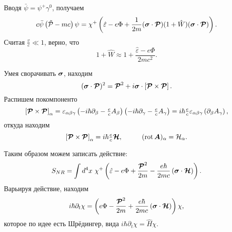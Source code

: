 Вводя $\bar{\psi} = \psi^+ \gamma^0$, получаем
\begin{equation*}
	c \bar{\psi} \left(\mathcal{\tilde{P}} - m c\right) \psi = 
	\chi^+ \left(
		\hat{\varepsilon} - e \Phi + \frac{1}{2m} (\mbox{\boldmath $\sigma$} \cdot \mbox{\boldmath $\mathcal P$}) 
 (1 + \hat{W}) (\mbox{\boldmath $\sigma$} \cdot \mbox{\boldmath $\mathcal P$})
 \right).
\end{equation*}
Считая $\frac{v}{c} \ll 1$, верно, что
\begin{equation*}
	1 + \hat{W} \approx	1 + \frac{\hat{\varepsilon}-e \Phi}{2 mc^2}.
\end{equation*}


Умея сворачивать $\mbox{\boldmath $\sigma$}$, находим
\begin{equation*}
	(\mbox{\boldmath $\sigma$} \cdot \mbox{\boldmath $\mathcal P$})^2 = \mbox{\boldmath $\mathcal P$}^2 + i \mbox{\boldmath $\sigma$} \cdot \left[\mbox{\boldmath $\mathcal P$} \times  \mbox{\boldmath $\mathcal P$}\right].
\end{equation*}
Распишем покомпоненто
\begin{equation*}
	\left[\mbox{\boldmath $\mathcal P$} \times  \mbox{\boldmath $\mathcal P$}\right]_\alpha = \varepsilon_{\alpha \beta \gamma} \left(
		- i \hbar \partial_\beta - \tfrac{e}{c} A_\beta
	\right)\left(
		- i \hbar \partial_\gamma - \tfrac{e}{c} A_\gamma
	\right) = i \hbar \tfrac{e}{c} \varepsilon_{\alpha \beta \gamma} \left(
		\partial_\beta A_\gamma
	\right),
\end{equation*}
откуда находим
\begin{equation*}
	\left[\vc{\mathcal P} \times  \vc{\mathcal P}\right]_\alpha = i \hbar \tfrac{e}{c} \vc{\mathcal H},
	\hspace{10 mm} 
	(\rot \vc{A})_\alpha = \mathcal H_\alpha.
\end{equation*}

Таким образом можем записать действие:
\begin{equation*}
	S_{NR} = \int d^4 x\ 
	\chi^+ \left(
		\hat{\varepsilon} - e \Phi + \frac{\vc{\mathcal P}^2}{2m} - \frac{e \hbar}{2 m c} \left(\vc{\sigma} \cdot \vc{\mathcal H}\right)
	\right).
\end{equation*}
Варьируя действие, находим
\begin{equation*}
	i \hbar \partial_t \chi = \left(
		e \Phi - \frac{\mbox{\boldmath $\mathcal P$}^2}{2m} + \frac{e \hbar}{2 m c} \left(\mbox{\boldmath $\sigma$} \cdot \mbox{\boldmath $\mathcal H$}\right)
	\right) \chi,
\end{equation*}
которое по идее есть Шрёдингер, вида $i \hbar \partial_t \chi = \hat{H} \chi$. 

